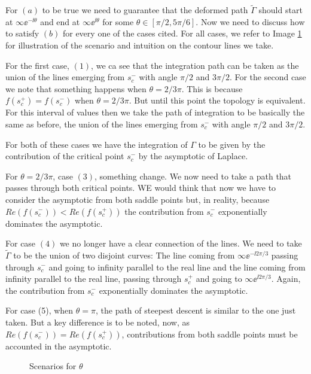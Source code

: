 For $(a)$ to be true we need to guarantee that the deformed path $\tilde{\Gamma}$ should start at $\infty \ee^{-\ii \theta}$ and end at $\infty \ee^{\ii \theta}$ for some $\theta \in [\pi/2, 5\pi/6]$. Now we need to discuss how to satisfy $(b)$ for every one of the cases cited. For all cases, we refer to Image \ref{Fig: theta cases} for illustration of the scenario and intuition on the contour lines we take.

For the first case, $(1)$, we  ca see that the integration path can be taken as the union of the lines emerging from $s_c^-$ with angle $\pi/2$ and $3\pi/2$. For the second case we note that something happens when $\theta = 2/3 \pi$. This is because $f(s_c^+) = f(s_c^-)$ when $\theta = 2/3 \pi$. But until this point the topology is equivalent. For this interval of values then we take the path of integration to be basically the same as before, the union of the lines emerging from $s_c^-$ with angle $\pi/2$ and $3\pi/2$.

For both of these cases we have the integration of $\Gamma$ to be given by the contribution of the critical point $s_c^-$ by the asymptotic of Laplace.

For $\theta = 2/3 \pi$, case $(3)$, something change. We now need to take a path that passes through both critical points. WE would think that now we have to consider the asymptotic from both saddle points but, in reality, because $Re(f(s_c^-)) < Re(f(s_c^+))$ the contribution from $s_c^-$ exponentially dominates the asymptotic.

For case $(4)$ we no longer have a clear connection of the lines. We need to take $\tilde{\Gamma}$ to be the union of two disjoint curves: The line coming from $\infty \ee^{-\ii 2\pi/3}$ passing through $s_c^-$ and going to infinity parallel to the real line and the line coming from infinity parallel to the real line, passing through $s_c^+$ and going to $\infty \ee^{\ii 2\pi/3}$. Again,  the contribution from $s_c^-$ exponentially dominates the asymptotic.

For case (5), when $\theta = \pi$, the path of steepest descent is similar to the one just taken. But a key difference is to be noted, now, as $Re(f(s_c^-)) = Re(f(s_c^+))$, contributions from both saddle points must be accounted in the asymptotic.


\begin{figure}[h] 
	\centering
	\caption{Scenarios for $\theta$}
	\label{Fig: theta cases}
\end{figure}